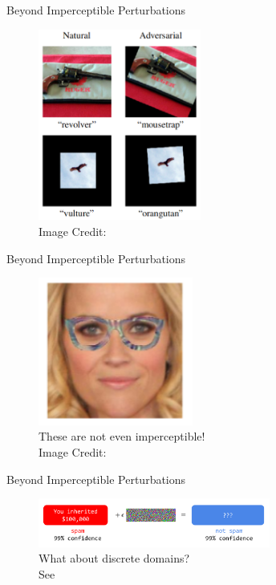 \documentclass[10pt]{beamer}
\begin{document}
\begin{frame}{Beyond Imperceptible Perturbations}
  \begin{figure}
    \includegraphics[width=2.1in]{rotation.png} \\
    Image Credit: \cite{EngstromTSM17}
  \end{figure}
\end{frame}


\begin{frame}{Beyond Imperceptible Perturbations}
  \begin{figure}
    \includegraphics[width=2in]{glasses.png} \\
    These are not even imperceptible! \\
    Image Credit: \cite{SharifBBR16}
  \end{figure}
\end{frame}


\begin{frame}{Beyond Imperceptible Perturbations}
  \begin{figure}
    \includegraphics[width=3in]{discrete.png} \\
    What about discrete domains? \\
    See \cite{KulynychHST18}
  \end{figure}
\end{frame}
\end{document}
